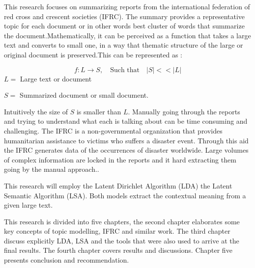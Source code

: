 This research focuses on summarizing reports from the international federation of red cross and crescent societies (IFRC). The summary provides  a  representative topic for each document or in other words best cluster of words that summarize the document.Mathematically, it can be perceived as a function that takes a large text and converts to small one, in a way that thematic structure of the large or original document is preserved.This can be represented as :

$$f:L \longrightarrow S, \quad \text{Such that} \quad |S|<< |L|$$
$L=$ Large text or document

 $S=$ Summarized document or small document.
  
Intuitively the size of $S$ is smaller than $L$.
Manually going through the reports and trying to understand what each is talking about can be time consuming and challenging. The IFRC is a non-governmental organization
that provides humanitarian assistance to victims who suffers a disaster event. Through this aid the 	IFRC generates data of the occurrences of disaster worldwide. Large volumes of complex information    are locked in the reports and it hard extracting them going by the manual approach.. 

This research will employ the Latent Dirichlet Algorithm (LDA)
the Latent Semantic Algorithm (LSA). Both models extract the contextual meaning from a given large text. 

This research is divided into five chapters, the second chapter elaborates some key concepts of topic modelling, IFRC and similar work. The third chapter discuss explicitly LDA, LSA and the tools that were also used to arrive at the final results. The fourth chapter covers results and discussions. Chapter five presents conclusion and recommendation.

  
